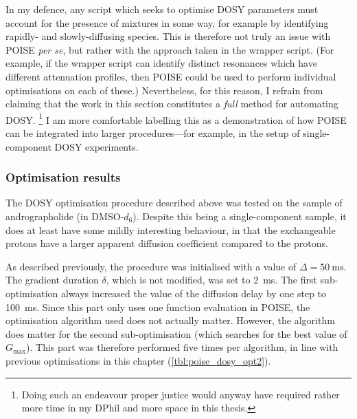 In my defence, any script which seeks to optimise DOSY parameters must account for the presence of mixtures in some way, for example by identifying rapidly- and slowly-diffusing species.
This is therefore not truly an issue with POISE \textit{per se}, but rather with the approach taken in the wrapper script.
(For example, if the wrapper script can identify distinct resonances which have different attenuation profiles, then POISE could be used to perform individual optimisations on each of these.)
Nevertheless, for this reason, I refrain from claiming that the work in this section constitutes a \textit{full} method for automating DOSY.%
\footnote{Doing such an endeavour proper justice would anyway have required rather more time in my DPhil and more space in this thesis.}
I am more comfortable labelling this as a demonstration of how POISE can be integrated into larger procedures---for example, in the setup of single-component DOSY experiments.


\subsubsection{Optimisation results}

The DOSY optimisation procedure described above was tested on the sample of andrographolide (in DMSO-$d_6$).
Despite this being a single-component sample, it does at least have some mildly interesting behaviour, in that the exchangeable  protons have a larger apparent diffusion coefficient compared to the  protons.

As described previously, the procedure was initialised with a value of $\Delta = \qty{50}{\ms}$.
The gradient duration $\delta$, which is not modified, was set to \qty{2}{\ms}.
The first sub-optimisation always increased the value of the diffusion delay by one step to \qty{100}{\ms}.
Since this part only uses one function evaluation in POISE, the optimisation algorithm used does not actually matter.
However, the algorithm does matter for the second sub-optimisation (which searches for the best value of $G_\text{max}$).
This part was therefore performed five times per algorithm, in line with previous optimisations in this chapter (\cref{tbl:poise_dosy_opt2}).

